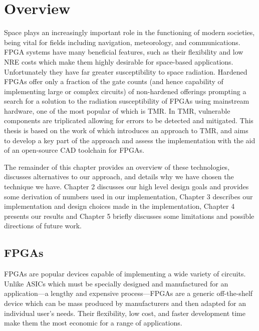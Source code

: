 \documentclass[12pt,final,oneside,a4paper]{dwThesis} %
\begin{document}
   \section{Overview}
   Space plays an increasingly
   important role in the functioning of modern societies, being vital for
   fields including navigation, meteorology, and
   communications\cite{OECDSpace}. \gls{FPGA} systems have many beneficial
   features, such as their flexibility and low \gls{NRE} costs which make them
   highly desirable for space-based applications. Unfortunately they have far
   greater susceptibility to space radiation. Hardened \glspl{FPGA} offer only
   a fraction of the gate counts (and hence capability of implementing large or
   complex circuits) of non-hardened offerings prompting a search for a
   solution to the radiation susceptibility of \glspl{FPGA} using mainstream
   hardware, one of the most popular of which is \gls{TMR}\cite{VFPGATMR}. In
   \gls{TMR}, vulnerable components are triplicated allowing for errors to be
   detected and mitigated. This thesis is based on the work
   of\cite{DiesselChange} which introduces an approach to \gls{TMR}, and aims
   to develop a key part of the approach and assess the implementation with the
   aid of an open-source \gls{CAD} toolchain for \glspl{FPGA}.
   
   The remainder of this chapter provides an overview of
   these technologies, discusses alternatives to our approach, and details why
   we have chosen the technique we have. Chapter 2 discusses our high level design goals and provides some derivation of numbers used in our implementation,
   Chapter 3 describes our implementation and design choices made
   in the implementation,
   Chapter 4 presents our results and
   Chapter 5 briefly discusses some limitations and possible directions of future work.
   \subsection{\glspl{FPGA}
   } \glspl{FPGA} are popular devices
   capable of implementing a wide variety of circuits. Unlike \glspl{ASIC}
   which must be specially designed and manufactured for an application---a
   lengthy and expensive process---\glspl{FPGA} are a generic off-the-shelf
   device which can be mass produced by manufacturers and then adapted for an
   individual user's needs. Their flexibility, low cost, and faster development
   time make them the most economic for a range of applications.
\end{document}
